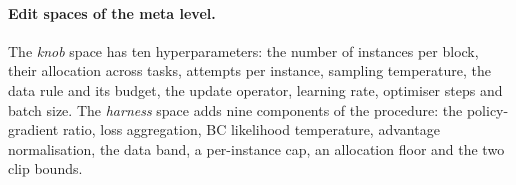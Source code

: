 \paragraph{Edit spaces of the meta level.} The \emph{knob} space has ten hyperparameters: the number of instances per block, their allocation across tasks, attempts per instance, sampling temperature, the data rule and its budget, the update operator, learning rate, optimiser steps and batch size. The \emph{harness} space adds nine components of the procedure: the policy-gradient ratio, loss aggregation, BC likelihood temperature, advantage normalisation, the data band, a per-instance cap, an allocation floor and the two clip bounds.
